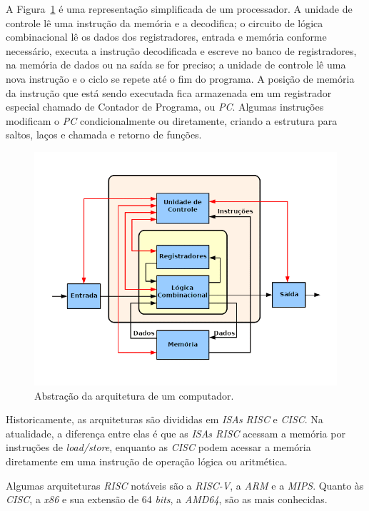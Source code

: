 {
    A Figura~\ref{fig:cpu_abstraction} é uma representação simplificada de um
    processador. A unidade de controle lê uma instrução da memória e a
    decodifica; o circuito de lógica combinacional lê os dados dos
    registradores, entrada e memória conforme necessário, executa a instrução
    decodificada e escreve no banco de registradores, na memória de dados ou
    na saída se for preciso; a unidade de controle lê uma nova instrução e o
    ciclo se repete até o fim do programa. A posição de memória da instrução
    que está sendo executada fica armazenada em um registrador especial chamado
    de Contador de Programa, ou \textit{PC}. Algumas instruções modificam o
    \textit{PC} condicionalmente ou diretamente, criando a estrutura para
    saltos, laços e chamada e retorno de funções.
}

\begin{figure}[H]
\centering
\includegraphics[width=.7\linewidth]
    {../images/ABasicComputer.png}
    \caption[Abstração da arquitetura de um computador]
    {Abstração da arquitetura de um
        computador.~\cite{wikimedia2015basiccpu}}\label{fig:cpu_abstraction}
\end{figure}

{
    Historicamente, as arquiteturas são divididas em \textit{ISAs}
    \textit{RISC} e \textit{CISC}. Na atualidade, a diferença entre elas é
    que as \textit{ISAs RISC} acessam a memória por instruções de
    \textit{load/store}, enquanto as \textit{CISC} podem acessar a memória
    diretamente em uma instrução de operação lógica ou aritmética.

    Algumas arquiteturas \textit{RISC} notáveis são a \textit{RISC-V}, a
    \textit{ARM} e a \textit{MIPS}. Quanto às \textit{CISC}, a \textit{x86} e
    sua extensão de 64 \textit{bits}, a \textit{AMD64}, são as mais conhecidas.
}


